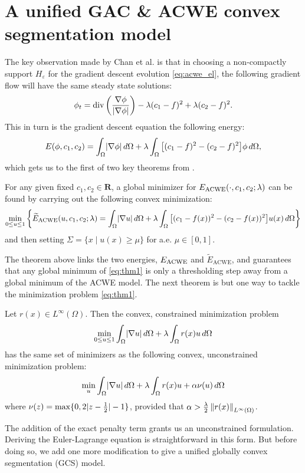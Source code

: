 \section{A unified GAC \& ACWE convex segmentation model}
The key observation made by Chan et al. \cite{chan2006algorithms} is that in choosing a non-compactly support $H_\varepsilon$ for the gradient descent evolution \eqref{eq:acwe_el}, the following gradient flow will have the same steady state solutions: 
\begin{align*}
\phi_t = \operatorname{div}\left(\frac{\nabla \phi}{\lvert\nabla \phi\rvert} \right) 
- \lambda (c_1 - f)^2 + \lambda (c_2 - f)^2 .
\end{align*}
This in turn is the gradient descent equation the following energy:
\begin{align}
E(\phi, c_1, c_2) 
= \int_\Omega \lvert\nabla \phi\rvert \,d\Omega 
+ \lambda \int_\Omega \big[ (c_1 - f)^2 - (c_2 - f)^2 \big] \phi \,d\Omega ,
\label{eq:mod_acwe}
\end{align}
which gets us to the first of two key theorems from \cite{chan2006algorithms}.

\begin{thm}
	For any given fixed $c_1, c_2 \in \mathbf{R}$, a global minimizer for $E_\textrm{ACWE}(\cdot, c_1, c_2; \lambda)$ can be found by carrying out the following convex minimization: 
	\begin{align}
	\min_{0\leq u \leq 1}\left\{
		\widetilde E_{\textrm{ACWE}} (u, c_1, c_2; \lambda)
		=
		\int_{\Omega} \lvert\nabla u\rvert \,d\Omega 
	+ \lambda\int_{\Omega} \big[ (c_1 - f(x) )^2 - (c_2 - f(x))^2 \big] u(x) \,d\Omega
	\right\}
	\label{eq:thm1}
	\end{align}
	and then setting $\Sigma = \{ x \mid u(x) \geq \mu \}$ for a.e. $\mu \in [0, 1]$.
	\label{thm:1}
\end{thm}
The theorem above links the two energies, $E_\textrm{ACWE}$ and $\widetilde E_\textrm{ACWE}$,
and guarantees that any global minimum of \eqref{eq:thm1} is only a thresholding step away from a global minimum of the ACWE model. The next theorem is but one way to tackle the minimization problem \eqref{eq:thm1}.

\begin{thm}
	Let $r(x) \in L^\infty(\Omega)$. Then the convex, constrained minimization problem
	\begin{align*}
	\min_{0 \leq u \leq 1} \int_{\Omega} \lvert\nabla u\rvert \,d\Omega + \lambda \int_{\Omega} r(x) u \,d\Omega 
	\end{align*}
	has the same set of minimizers as the following convex, unconstrained minimization problem:
	\begin{align*}
	\min_u \int_{\Omega} \lvert\nabla u\rvert \,d\Omega + \lambda \int_{\Omega} r(x) u + \alpha \nu(u) \,d\Omega 
	\end{align*}
	where $\nu(z) = \max\{ 0 , 2\lvert z - \frac{1}{2} \rvert - 1\}$, provided that $\alpha > \frac{\lambda}{2}\left\lVert r(x)\right\rVert_{L^\infty(\Omega)}$.
	\label{thm:2}
\end{thm}
The addition of the exact penalty term \cite{hiriart1993convexI,hiriart1993convexII} grants us an unconstrained formulation. Deriving the Euler-Lagrange equation is straightforward in this form. But before doing so, we add one more modification to give a unified globally convex segmentation (GCS) model.


